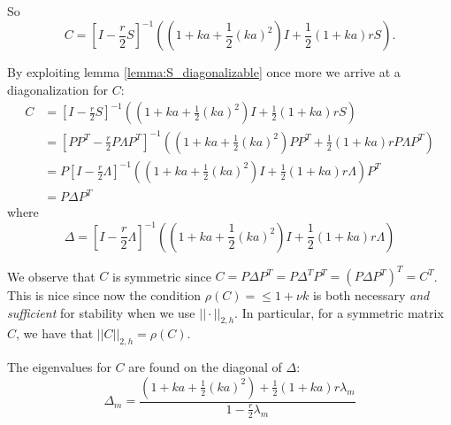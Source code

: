 So
\begin{equation}
    C = {\left[I - \frac{r}{2}S\right]}^{-1} \left( \left(1+ka+\frac{1}{2}(ka)^2\right)I + \frac{1}{2}\left(1+ka\right)rS\right).
  \end{equation}

By exploiting lemma \ref{lemma:S_diagonalizable} once more
we arrive at a diagonalization for \( C \):
\begin{align*}
  C &= {\left[I - \frac{r}{2}S\right]}^{-1} \left( \left(1+ka+\frac{1}{2}(ka)^2\right)I + \frac{1}{2}\left(1+ka\right)rS\right) \\
    &= {\left[PP^T - \frac{r}{2}P\Lambda P^T\right]}^{-1} \left( \left(1+ka+\frac{1}{2}(ka)^2\right)PP^T + \frac{1}{2}\left(1+ka\right)r P\Lambda P^T\right) \\
    &= P{\left[I - \frac{r}{2}\Lambda \right]}^{-1} \left( \left(1+ka+\frac{1}{2}(ka)^2\right)I + \frac{1}{2}\left(1+ka\right)r \Lambda \right) P^T \\
    &= P \Delta P^T
\end{align*}
where
\begin{equation}
    \Delta = {\left[I - \frac{r}{2}\Lambda \right]}^{-1} \left( \left(1+ka+\frac{1}{2}(ka)^2\right)I + \frac{1}{2}\left(1+ka\right)r \Lambda \right)
\end{equation}

We observe that \( C \) is symmetric
since \( C = P \Delta P^T = P \Delta^T P^T = \left(P \Delta P^T\right)^T = C^T \).
This is nice since now the condition
\( \rho(C) = \le 1 + \nu k \) is
both necessary \textit{and} \textit{sufficient} for stability
when we use \( ||\cdot||_{2,h} \).
In particular, for a symmetric matrix \( C \),
we have that \( ||C||_{2,h} = \rho(C) \).

The eigenvalues for \( C \) are found on the diagonal of \( \Delta \):
\begin{equation}
  \Delta_m =
      \frac{\left(1+ka+\frac{1}{2}(ka)^2\right) + \frac{1}{2}\left(1+ka\right)r \lambda_m}
      {1 - \frac{r}{2} \lambda_m}
\end{equation}

